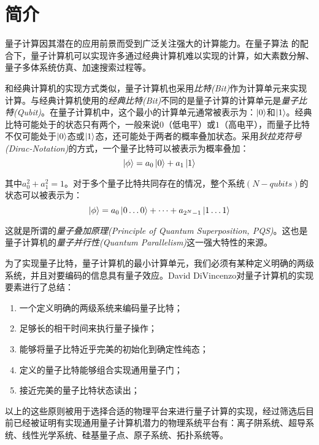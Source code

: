 
\chapter{简介}

量子计算因其潜在的应用前景而受到广泛关注强大的计算能力。在量子算法
的配合下，量子计算机可以实现许多通过经典计算机难以实现的计算，如大素数分解\cite[]{Shor_1997, Singleton_Jr_2023}、量子多体系统仿真\cite[]{Feynman_1982, Lloyd_1996}、加速搜索过程\cite[]{Grover_2002}等。

和经典计算机的实现方式类似，量子计算机也采用\emph{比特(Bit)}作为计算单元来实现计算。与经典计算机使用的\emph{经典比特(Bit)}不同的是量子计算的计算单元是\emph{量子比特(Qubit)}。在量子计算机中，这个最小的计算单元通常被表示为：$\ket{0}$和$\ket{1}$。经典比特可能处于的状态只有两个，一般来说$0$（低电平）或$1$（高电平），而量子比特不仅可能处于$\ket{0}$态或$\ket{1}$态，还可能处于两者的概率叠加状态。采用\emph{狄拉克符号(Dirac-Notation)}的方式，一个量子比特可以被表示为概率叠加：$$\ket{\phi}=a_0\ket{0}+a_1\ket{1}$$

其中$a_0^2+a_1^2=1$。对于多个量子比特共同存在的情况，整个系统$(N-qubits)$的状态可以被表示为：$$\ket{\phi}=a_0\ket{0\dots0}+\dots+a_{2^N-1}\ket{1\dots1}$$

这就是所谓的\emph{量子叠加原理(Principle of Quantum Superposition, PQS)}\cite[]{Fedorov_Manko_2019}。这也是量子计算机的\emph{量子并行性(Quantum Parallelism)}这一强大特性的来源。

为了实现量子比特，量子计算机的最小计算单元，我们必须有某种定义明确的两级系统，并且对要编码的信息具有量子效应。David DiVincenzo对量子计算机的实现要素进行了总结\cite[]{DiVincenzo_2000}：
\begin{enumerate}
    \item 一个定义明确的两级系统来编码量子比特；
    \item 足够长的相干时间来执行量子操作；
    \item 能够将量子比特近乎完美的初始化到确定性纯态；
    \item 定义的量子比特能够组合实现通用量子门；
    \item 接近完美的量子比特状态读出；
\end{enumerate}

以上的这些原则被用于选择合适的物理平台来进行量子计算的实现，经过筛选后目前已经被证明有实现通用量子计算机潜力的物理系统平台有：离子阱系统、超导系统、线性光学系统、硅基量子点、原子系统、拓扑系统等。

